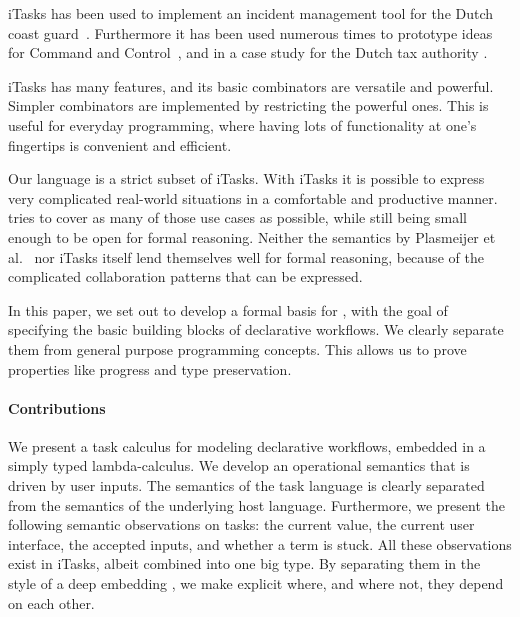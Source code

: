 iTasks has been used to implement an incident management tool for the Dutch coast guard~\cite{conf/iscram/LijnseJP12}.
Furthermore it has been used numerous times to prototype ideas for Command and Control~\cite{theses/nlda/Kool17, theses/radboud/Stutterheim17}, and in a case study for the Dutch tax authority \cite{conf/sfp/StutterheimAP17}.

iTasks has many features, and its basic combinators are versatile and powerful.
Simpler combinators are implemented by restricting the powerful ones.
This is useful for everyday programming, where having lots of functionality at one's fingertips is convenient and efficient.

Our language is a strict subset of iTasks.
With iTasks it is possible to express very complicated real-world situations in a comfortable and productive manner.
\TOPHAT{}
tries to cover as many of those use cases as possible, while still being small enough to be open for formal reasoning.
Neither the semantics by Plasmeijer et al.~\cite{conf/ppdp/PlasmeijerLMAK12} nor iTasks itself lend themselves well for formal reasoning, because of the complicated collaboration patterns that can be expressed.

In this paper, we set out to develop a formal basis for \TOP, with the goal of specifying the basic building blocks of declarative workflows.
We clearly separate them from general purpose programming concepts.
This allows us to prove properties like progress and type preservation.

\paragraph{Contributions}
We present a task calculus for modeling declarative workflows, embedded in a simply typed lambda-calculus.
We develop an operational semantics that is driven by user inputs.
The semantics of the task language is clearly separated from the semantics of the underlying host language.
Furthermore, we present the following semantic observations on tasks: the current value, the current user interface, the accepted inputs, and whether a term is stuck.
All these observations exist in iTasks, albeit combined into one big type.
By separating them in the style of a deep embedding \cite{conf/cefp/Gibbons13}, we make explicit where, and where not, they depend on each other.

